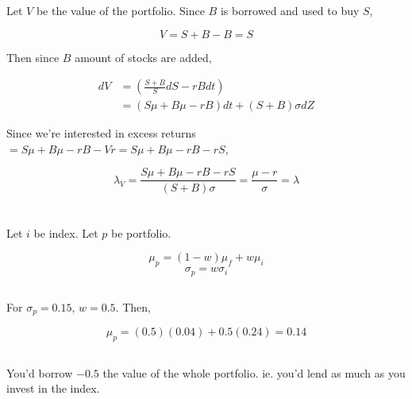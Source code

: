 \documentclass[11pt]{scrartcl}
\begin{document}
Let $V$ be the value of the portfolio. Since $B$ is borrowed and used to buy $S$, 

\[V = S + B - B = S\]

Then since $B$ amount of stocks are added,

\begin{align*}
dV &= \left(\frac{S+B}{S}dS -rBdt\right) \\
&= \left(S\mu + B\mu - rB\right)dt + (S+B)\sigma dZ
\end{align*}

Since we're interested in excess returns $= S\mu + B\mu - rB - Vr = S\mu + B\mu - rB - rS$, 

\[\lambda_V = \frac{S\mu + B\mu - rB - rS}{(S+B)\sigma} = \frac{\mu-r}{\sigma} = \lambda\]


\section{}

Let $i$ be index. Let $p$ be portfolio.

\[\mu_p = (1-w)\mu_f + w\mu_i\]
\[\sigma_p = w\sigma_i\]

\subsection{}

For $\sigma_p = 0.15$, $w = 0.5$. Then,

\[\mu_p = (0.5)(0.04) + 0.5(0.24) = 0.14\]

\subsection{}

You'd borrow $-0.5$ the value of the whole portfolio. ie. you'd lend as much as you invest in the index.
\end{document}
